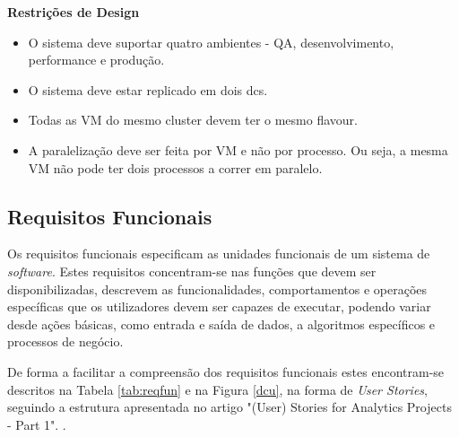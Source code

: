 \textbf{Restrições de Design}
\label{sec:3-restricao-design}
\begin{itemize}
  \item O sistema deve suportar quatro ambientes - \ac{QA}, desenvolvimento, 
    performance e produção.
  \item O sistema deve estar replicado em dois \glspl{dc}.
  \item Todas as \ac{VM} do mesmo \gls{cluster} devem ter o mesmo \gls{flavour}.
  \item A paralelização deve ser feita por \ac{VM} e não por processo. Ou seja, a mesma \ac{VM} 
    não pode ter dois processos a correr em paralelo.
\end{itemize}

\subsection{Requisitos Funcionais}
\label{sec:3-rf}

Os requisitos funcionais especificam as unidades funcionais de um sistema de \textit{software}.
Estes requisitos concentram-se nas funções que devem ser disponibilizadas, descrevem as
funcionalidades, comportamentos e operações específicas que os utilizadores devem ser capazes de 
executar, podendo variar desde ações básicas, como entrada e saída de dados, a algoritmos 
específicos e processos de negócio.

De forma a facilitar a compreensão dos requisitos funcionais estes encontram-se descritos na 
Tabela \ref{tab:reqfun} e na Figura \ref{dcu}, na forma de \textit{User Stories}, seguindo a 
estrutura apresentada no artigo "(User) Stories for Analytics Projects - Part 1". \cite{us}.

